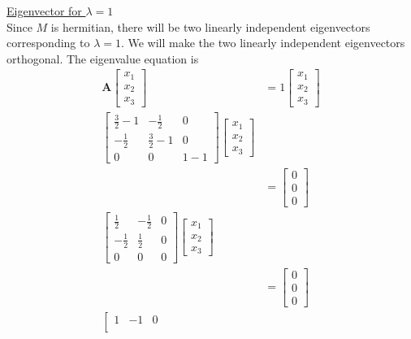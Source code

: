 \begin{enumerate}
	\underline{Eigenvector for $\lambda=1$}\\
	Since $M$ is hermitian, there will be two linearly independent eigenvectors corresponding to $\lambda=1$. We will make the two linearly independent eigenvectors orthogonal. The eigenvalue equation is
	\begin{align*}
		\mathbf{A} \left[\begin{matrix}
		x_1 \\ x_2 \\ x_3
		\end{matrix}\right]
		&= 1 \left[\begin{matrix}
		x_1 \\ x_2 \\ x_3
		\end{matrix}\right] \\
		\left[\begin{matrix}
		\frac{3}{2}-1 & -\frac{1}{2} & 0 \\
		-\frac{1}{2} &\frac{3}{2}-1 & 0 \\
		0 & 0 & 1-1
		\end{matrix}\right]
		\left[\begin{matrix}
		x_1 \\ x_2 \\ x_3
		\end{matrix}\right] \\
		&=
		\left[\begin{matrix}
		0 \\ 0 \\ 0
		\end{matrix}\right] \\
		\left[\begin{matrix}
		\frac{1}{2} & -\frac{1}{2} & 0 \\
		-\frac{1}{2} &\frac{1}{2} & 0 \\
		0 & 0 & 0
		\end{matrix}\right]
		\left[\begin{matrix}
		x_1 \\ x_2 \\ x_3
		\end{matrix}\right] \\
		&=
		\left[\begin{matrix}
		0 \\ 0 \\ 0
		\end{matrix}\right]\\
		\left[\begin{matrix}
		1 & -1 & 0 \\

\end{matrix}
\end{align*}
\end{enumerate}
